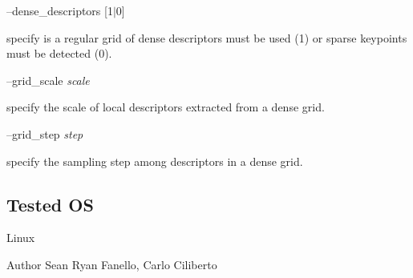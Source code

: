 --dense\+\_\+descriptors {\itshape }\mbox{[}1$\vert$0\mbox{]}
\begin{DoxyItemize}
\item specify is a regular grid of dense descriptors must be used (1) or sparse keypoints must be detected (0).
\end{DoxyItemize}

--grid\+\_\+scale {\itshape scale} 
\begin{DoxyItemize}
\item specify the scale of local descriptors extracted from a dense grid.
\end{DoxyItemize}

--grid\+\_\+step {\itshape step} 
\begin{DoxyItemize}
\item specify the sampling step among descriptors in a dense grid.
\end{DoxyItemize}\hypertarget{group__icub__sparseCoder_tested_os_sec}{}\subsection{Tested O\+S}\label{group__icub__sparseCoder_tested_os_sec}
Linux

\begin{DoxyAuthor}{Author}
Sean Ryan Fanello, Carlo Ciliberto 
\end{DoxyAuthor}
